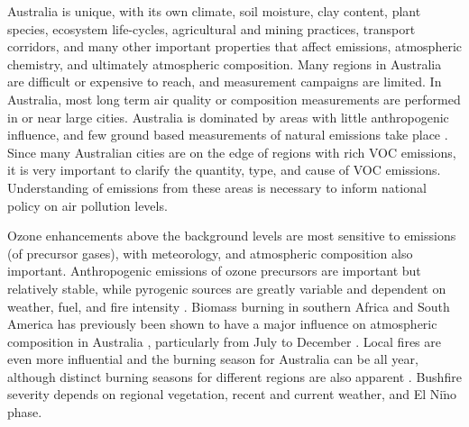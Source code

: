   Australia is unique, with its own climate, soil moisture, clay content, plant species, ecosystem life-cycles, agricultural and mining practices, transport corridors, and many other important properties that affect emissions, atmospheric chemistry, and ultimately atmospheric composition.
  Many regions in Australia are difficult or expensive to reach, and measurement campaigns are limited.
  In Australia, most long term air quality or composition measurements are performed in or near large cities.
  Australia is dominated by areas with little anthropogenic influence, and few ground based measurements of natural emissions take place \parencite{VanDerA2008}.
  Since many Australian cities are on the edge of regions with rich VOC emissions, it is very important to clarify the quantity, type, and cause of VOC emissions.
  Understanding of emissions from these areas is necessary to inform national policy on air pollution levels.
  
  Ozone enhancements above the background levels are most sensitive to emissions (of precursor gases), with meteorology, and atmospheric composition also important.
  Anthropogenic emissions of ozone precursors are important but relatively 
  stable, while pyrogenic sources are greatly variable and dependent on 
  weather, fuel, and fire intensity \parencite[e.g.,][]{Lawson2017}. 
  Biomass burning in southern Africa and South America has previously been shown to have a major influence on atmospheric composition in Australia \parencite{Oltmans2001, Gloudemans2006, Edwards2006}, particularly from July to December \parencite{Pak2003, Liu2016}.
  Local fires are even more influential and the burning season for Australia can be all year, although distinct burning seasons for different regions are also apparent \parencite{Smith2007}.
  Bushfire severity depends on regional vegetation, recent and current weather, and El Ni$\tilde{\textrm{n}}$o phase.
  
  
